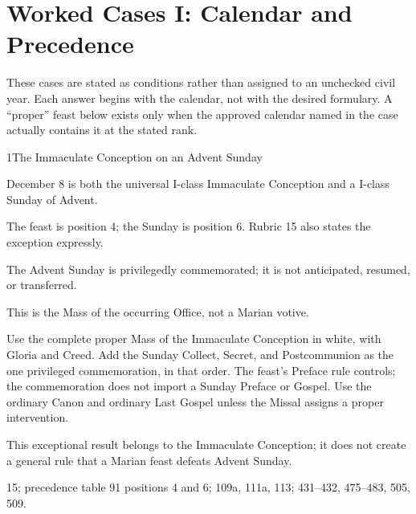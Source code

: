 \section{Worked Cases I: Calendar and Precedence}
\label{sec:calendar-cases}

These cases are stated as conditions rather than assigned to an unchecked civil year.  Each answer begins with the calendar, not with the desired formulary.  A “proper” feast below exists only when the approved calendar named in the case actually contains it at the stated rank.

\begin{casefile}{1}{The Immaculate Conception on an Advent Sunday}
\item[Calendar facts] December 8 is both the universal I-class Immaculate Conception and a I-class Sunday of Advent.
\item[Ranks and rows] The feast is position 4; the Sunday is position 6.  Rubric 15 also states the exception expressly.
\item[Impeded item] The Advent Sunday is privilegedly commemorated; it is not anticipated, resumed, or transferred.
\item[Mass category] This is the Mass of the occurring Office, not a Marian votive.
\item[Assembly] Use the complete proper Mass of the Immaculate Conception in white, with Gloria and Creed.  Add the Sunday Collect, Secret, and Postcommunion as the one privileged commemoration, in that order.  The feast's Preface rule controls; the commemoration does not import a Sunday Preface or Gospel.  Use the ordinary Canon and ordinary Last Gospel unless the Missal assigns a proper intervention.
\item[Boundary] This exceptional result belongs to the Immaculate Conception; it does not create a general rule that a Marian feast defeats Advent Sunday.
\item[Rubric locus] 15; precedence table 91 positions 4 and 6; 109a, 111a, 113; 431--432, 475--483, 505, 509.
\end{casefile}

